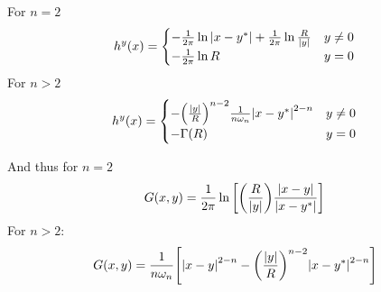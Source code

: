For $n=2$
$$h^y(x) = \begin{cases}
-\frac{1}{2\pi} \ln \abs{x-y^*} +\frac{1}{2\pi} \ln \frac{R}{\abs{y}} & y\neq0\\
- \frac{1}{2\pi} \ln R & y=0
\end{cases}$$
For $n>2$
$$h^y(x) = \begin{cases}
- \qty(\frac{\abs{y}}{R})^{n-2} \frac{1}{n\omega_n} \abs{x-y^*}^{2-n} & y\neq0\\
- \Gamma(R) & y=0
\end{cases}$$

And thus for $n=2$
$$G(x,y) = \frac{1}{2\pi} \ln\qty[\qty(\frac{R}{\abs{y}}) \frac{\abs{x-y}}{\abs{x-y^*}}]$$
For $n>2$:
$$G(x,y) = \frac{1}{n\omega_n} \qty[ \abs{x-y}^{2-n} - \qty(\frac{\abs{y}}{R})^{n-2} \abs{x-y^*}^{2-n}]$$